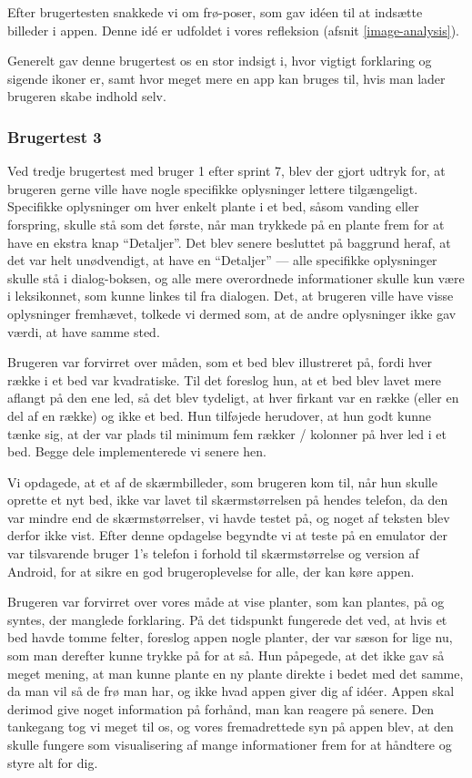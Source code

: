 Efter brugertesten snakkede vi om frø-poser, som gav idéen til at indsætte billeder i appen. Denne idé er udfoldet i vores refleksion (afsnit \ref{image-analysis}).

Generelt gav denne brugertest os en stor indsigt i, hvor vigtigt forklaring og sigende ikoner er, samt hvor meget mere en app kan bruges til, hvis man lader brugeren skabe indhold selv.

\subsubsection{Brugertest 3}

Ved tredje brugertest med bruger 1 efter sprint 7, blev der gjort udtryk for, at brugeren gerne ville have nogle specifikke oplysninger lettere tilgængeligt. Specifikke oplysninger om hver enkelt plante i et bed, såsom vanding eller forspring, skulle stå som det første, når man trykkede på en plante frem for at have en ekstra knap ``Detaljer''. Det blev senere besluttet på baggrund heraf, at det var helt unødvendigt, at have en ``Detaljer'' --- alle specifikke oplysninger skulle stå i dialog-boksen, og alle mere overordnede informationer skulle kun være i leksikonnet, som kunne linkes til fra dialogen. Det, at brugeren ville have visse oplysninger fremhævet, tolkede vi dermed som, at de andre oplysninger ikke gav værdi, at have samme sted.

Brugeren var forvirret over måden, som et bed blev illustreret på, fordi hver række i et bed var kvadratiske. Til det foreslog hun, at et bed blev lavet mere aflangt på den ene led, så det blev tydeligt, at hver firkant var en række (eller en del af en række) og ikke et bed. Hun tilføjede herudover, at hun godt kunne tænke sig, at der var plads til minimum fem rækker / kolonner på hver led i et bed. Begge dele implementerede vi senere hen.

Vi opdagede, at et af de skærmbilleder, som brugeren kom til, når hun skulle oprette et nyt bed, ikke var lavet til skærmstørrelsen på hendes telefon, da den var mindre end de skærmstørrelser, vi havde testet på, og noget af teksten blev derfor ikke vist. Efter denne opdagelse begyndte vi at teste på en emulator der var tilsvarende bruger 1's telefon i forhold til skærmstørrelse og version af Android, for at sikre en god brugeroplevelse for alle, der kan køre appen.

Brugeren var forvirret over vores måde at vise planter, som kan plantes, på og syntes, der manglede forklaring. På det tidspunkt fungerede det ved, at hvis et bed havde tomme felter, foreslog appen nogle planter, der var sæson for lige nu, som man derefter kunne trykke på for at så. Hun påpegede, at det ikke gav så meget mening, at man kunne plante en ny plante direkte i bedet med det samme, da man vil så de frø man har, og ikke hvad appen giver dig af idéer. Appen skal derimod give noget information på forhånd, man kan reagere på senere. Den tankegang tog vi meget til os, og vores fremadrettede syn på appen blev, at den skulle fungere som visualisering af mange informationer frem for at håndtere og styre alt for dig.

